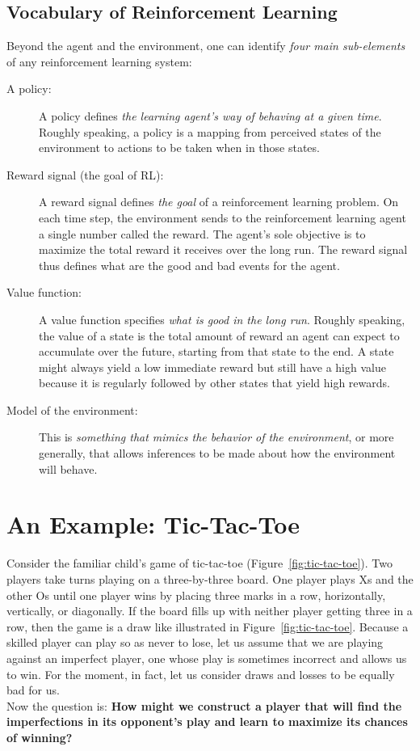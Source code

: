 \subsection{Vocabulary of Reinforcement Learning}
Beyond the agent and the environment, one can identify \emph{four main sub-elements} of any reinforcement learning system:
\begin{description}
    \item[A policy:] A policy defines \emph{the learning agent's way of behaving at a given time}. Roughly speaking, a policy is a mapping from perceived states of the environment to actions to be taken when in those states.
    \item[Reward signal (the goal of RL):] A reward signal defines \emph{the goal} of a reinforcement learning problem. On each time step, the environment sends to the reinforcement learning agent a single number called the reward. The agent's sole objective is to maximize the total reward it receives over the long run. The reward signal thus defines what are the good and bad events for the agent.
    \item[Value function:] A value function specifies \emph{what is good in the long run}. Roughly speaking, the value of a state is the total amount of reward an agent can expect to accumulate over the future, starting from that state to the end. A state might always yield a low immediate reward but still have a high value because it is regularly followed by other states that yield high rewards.
    \item[Model of the environment:] This is \emph{something that mimics the behavior of the environment}, or more generally, that allows inferences to be made about how the environment will behave.
\end{description}

\section{An Example: Tic-Tac-Toe}
Consider the familiar child's game of tic-tac-toe (Figure~\ref{fig:tic-tac-toe}). Two players take turns playing on a three-by-three board. One player plays Xs and the other Os until one player wins by placing three marks in a row, horizontally, vertically, or diagonally.
If the board fills up with neither player getting three in a row, then the game is a draw like illustrated in Figure~\ref{fig:tic-tac-toe}. Because a skilled player can play so as never to lose, let us assume that we are playing against an imperfect player, one whose play is sometimes incorrect and allows us to win. 
For the moment, in fact, let us consider draws and losses to be equally bad for us. \\
Now the question is: \textbf{How might we construct a player that will find the imperfections in its opponent's play and learn to maximize its
chances of winning?}

